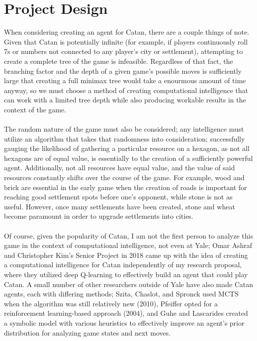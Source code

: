 \documentclass[a4paper, 11pt]{article}
\begin{document}
\section{Project Design}

When considering creating an agent for Catan, there are a couple things of note. Given that Catan is potentially infinite (for example, if players continuously roll 7s or numbers not connected to any player's city or settlement), attempting to create a complete tree of the game is infeasible. Regardless of that fact, the branching factor and the depth of a given game's possible moves is sufficiently large that creating a full minimax tree would take a enourmous amount of time anyway, so we must choose a method of creating computational intelligence that can work with a limited tree depth while also producing workable results in the context of the game.
\\ \\ 
\noindent The random nature of the game must also be considered; any intelligence must utilize an algorithm that takes that randomness into consideration; successfully gauging the likelihood of gathering a particular resource on a hexagon, as not all hexagons are of equal value, is essentially to the creation of a sufficiently powerful agent. Additionally, not all resources have equal value, and the value of said resources constantly shifts over the course of the game. For example, wood and brick are essential in the early game when the creation of roads is important for reaching good settlement spots before one's opponent, while stone is not as useful. However, once many settlements have been created, stone and wheat become paramount in order to upgrade settlements into cities.
\\ \\
\noindent Of course, given the popularity of Catan, I am not the first person to analyze this game in the context of computational intelligence, not even at Yale; Omar Ashraf and Christopher Kim's Senior Project in 2018 came up with the idea of creating a computational intelligence for Catan independently of my research proposal, where they utilized deep Q-learning to effectively build an agent that could play Catan. A small number of other researchers outside of Yale have also made Catan agents, each with differing methods; Szita, Chaslot, and Spronck used MCTS when the algorithm was still relatively new (2010), Pfeiffer opted for a reinforcement learning-based approach (2004), and Guhe and Lascarides created a symbolic model with various heuristics to effectively improve an agent's prior distribution for analyzing game states and next moves.
\end{document}
